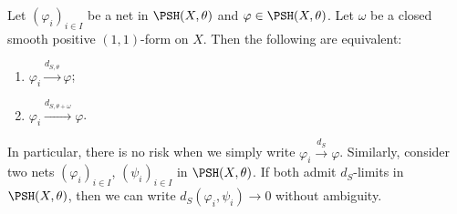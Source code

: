 \begin{corollary}\label{cor:dSconv_changetheta}
    Let $(\varphi_i)_{i\in I}$ be a net in $\PSH(X,\theta)$ and $\varphi\in \PSH(X,\theta)$. Let $\omega$ be a closed smooth positive $(1,1)$-form on $X$. Then the following are equivalent:
    \begin{enumerate}
        \item\label{itm:cor:dSconv_changetheta:1} $\varphi_i\xrightarrow{d_{S,\theta}}\varphi$;
        \item\label{itm:cor:dSconv_changetheta:2} $\varphi_i\xrightarrow{d_{S,\theta+\omega}}\varphi$.
    \end{enumerate}
\end{corollary}
In particular, there is no risk when we simply write $\varphi_i\xrightarrow{d_S}\varphi$. Similarly, consider two nets $(\varphi_i)_{i\in I}$, $(\psi_i)_{i\in I}$ in $\PSH(X,\theta)$. If both admit $d_S$-limits in $\PSH(X,\theta)$, then we can write $d_S(\varphi_i,\psi_i)\to 0$ without ambiguity.

